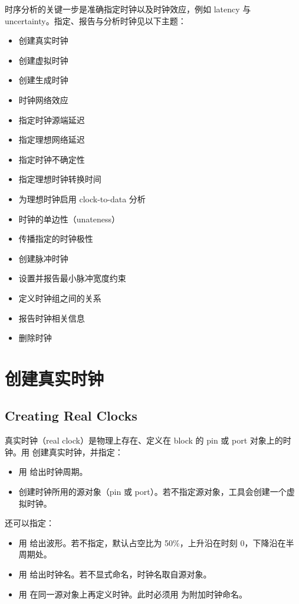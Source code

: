 \label{chap:clocks}

时序分析的关键一步是准确指定时钟以及时钟效应，例如 latency 与 uncertainty。指定、报告与分析时钟见以下主题：
\begin{itemize}
  \item 创建真实时钟
  \item 创建虚拟时钟
  \item 创建生成时钟
  \item 时钟网络效应
  \item 指定时钟源端延迟
  \item 指定理想网络延迟
  \item 指定时钟不确定性
  \item 指定理想时钟转换时间
  \item 为理想时钟启用 clock-to-data 分析
  \item 时钟的单边性（unateness）
  \item 传播指定的时钟极性
  \item 创建脉冲时钟
  \item 设置并报告最小脉冲宽度约束
  \item 定义时钟组之间的关系
  \item 报告时钟相关信息
  \item 删除时钟
\end{itemize}

\section{创建真实时钟}
\subsection*{Creating Real Clocks}

真实时钟（real clock）是物理上存在、定义在 block 的 pin 或 port 对象上的时钟。用  创建真实时钟，并指定：
\begin{itemize}
  \item 用  给出时钟周期。
  \item 创建时钟所用的源对象（pin 或 port）。若不指定源对象，工具会创建一个虚拟时钟。
\end{itemize}

还可以指定：
\begin{itemize}
  \item 用  给出波形。若不指定，默认占空比为 50\%，上升沿在时刻 0，下降沿在半周期处。
  \item 用  给出时钟名。若不显式命名，时钟名取自源对象。
  \item 用  在同一源对象上再定义时钟。此时必须用  为附加时钟命名。
\end{itemize}

